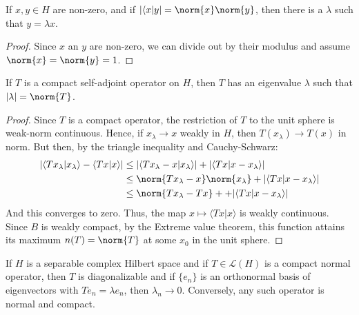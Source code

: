     \begin{theorem}
        If $x,y\in{H}$ are non-zero, and if
        $|\langle{x|y}|=\norm{x}\norm{y}$, then there is a
        $\lambda$ such that $y=\lambda{x}$.
    \end{theorem}
    \begin{proof}
        Since $x$ an $y$ are non-zero, we can divide out
        by their modulus and assume $\norm{x}=\norm{y}=1$.
    \end{proof}
    \begin{theorem}
        If $T$ is a compact self-adjoint operator on
        $H$, then $T$ has an eigenvalue $\lambda$ such that
        $|\lambda|=\norm{T}$.
    \end{theorem}
    \begin{proof}
        Since $T$ is a compact operator, the restriction of
        $T$ to the unit sphere is weak-norm continuous. Hence,
        if $x_{\lambda}\rightarrow{x}$ weakly in $H$, then
        $T(x_{\lambda})\rightarrow{T}(x)$ in norm. But then,
        by the triangle inequality and Cauchy-Schwarz:
        \begin{subequations}
            \begin{align}
                |\langle{Tx_{\lambda}|x_{\lambda}}\rangle-
                    \langle{Tx|x}\rangle|
                &\leq|\langle{Tx_{\lambda}-x|x_{\lambda}}\rangle|
                +|\langle{Tx|x-x_{\lambda}}\rangle|\\
                &\leq\norm{Tx_{\lambda}-x}\norm{x_{\lambda}}
                +|\langle{Tx|x-x_{\lambda}}\rangle|\\
                &\leq\norm{Tx_{\lambda}-Tx}+
                +|\langle{Tx|x-x_{\lambda}}\rangle|
            \end{align}
        \end{subequations}
        And this converges to zero. Thus, the map
        $x\mapsto\langle{Tx|x}\rangle$ is weakly continuous.
        Since $B$ is weakly compact, by the Extreme value
        theorem, this function attains its maximum
        $n(T)=\norm{T}$ at some $x_{0}$ in the unit sphere.
    \end{proof}
    \begin{theorem}
        If $H$ is a separable complex Hilbert space and if
        $T\in\mathcal{L}(H)$ is a compact normal operator,
        then $T$ is diagonalizable and if $\{e_{n}\}$ is an
        orthonormal basis of eigenvectors with
        $Te_{n}=\lambda{e}_{n}$, then
        $\lambda_{n}\rightarrow{0}$. Conversely, any such
        operator is normal and compact.
    \end{theorem}
